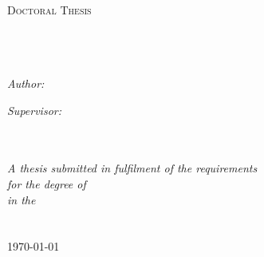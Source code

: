 \documentclass[11pt, oneside, chapterprefix=True]{Thesis} %
\begin{document}
\begin{titlepage}
\begin{center}

\textsc{\LARGE \univname}\\[1.5cm] %
\textsc{\Large Doctoral Thesis}\\[1.5cm] %

\HRule \\[0.4cm] %
{\huge \bfseries \ttitle}\\[0.4cm] %
\HRule \\[1.5cm] %
 
\begin{minipage}{0.4\textwidth}
\begin{flushleft} \large
\emph{Author:}\\
\href{http://cbio.ensmp.fr/~nvaroquaux}{\authornames} %
\end{flushleft}
\end{minipage}
\begin{minipage}{0.4\textwidth}
\begin{flushright} \large
\emph{Supervisor:} \\
\href{http://cbio.ensmp.fr/~jvert}{\supnameOne} \\ %
\end{flushright}
\end{minipage}\\[3cm]
 
\large \textit{A thesis submitted in fulfilment of the requirements\\ for the degree of \degreename}\\[0.3cm] %
\textit{in the}\\[0.4cm]
\groupname\\\deptname\\[2cm] %
 
{\large \today}\\[4cm] %
 
\vfill
\end{center}

\afterpage{\blankpage} %

\end{titlepage}
\end{document}
